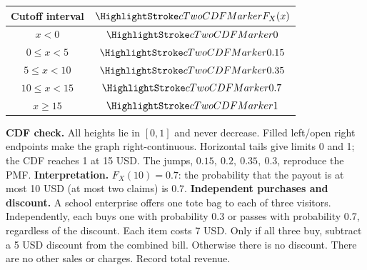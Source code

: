 \par\noindent\begin{minipage}[t]{.37\linewidth}\vspace{0pt}\centering
\begin{tabular}{cc}\toprule
Cutoff interval & $\cTwoCDFHL{F_X(x)}$ \\ \midrule
$x<0$ & $\cTwoCDFHL{0}$ \\
$0\leq x<5$ & $\cTwoCDFHL{0.15}$ \\
$5\leq x<10$ & $\cTwoCDFHL{0.35}$ \\
$10\leq x<15$ & $\cTwoCDFHL{0.7}$ \\
$x\geq 15$ & $\cTwoCDFHL{1}$ \\
\bottomrule\end{tabular}
\end{minipage}\hfill\begin{minipage}[t]{.60\linewidth}\vspace{0pt}\centering
{}
\end{minipage}\par
\textbf{CDF check.} All heights lie in $[0,1]$ and never decrease. Filled left/open right endpoints make the graph right-continuous. Horizontal tails give limits 0 and 1; the CDF reaches 1 at 15 USD. The jumps, $0.15,\ 0.2,\ 0.35,\ 0.3$, reproduce the PMF.
\textbf{Interpretation.} $F_X(10)=0.7$: the probability that the payout is at most 10 USD (at most two claims) is 0.7.
\vfill
\clearpage
{}
\textbf{Independent purchases and discount.} A school enterprise offers one tote bag to each of three visitors. Independently, each buys one with probability 0.3 or passes with probability 0.7, regardless of the discount. Each item costs 7 USD. Only if all three buy, subtract a 5 USD discount from the combined bill. Otherwise there is no discount. There are no other sales or charges. Record total revenue.

